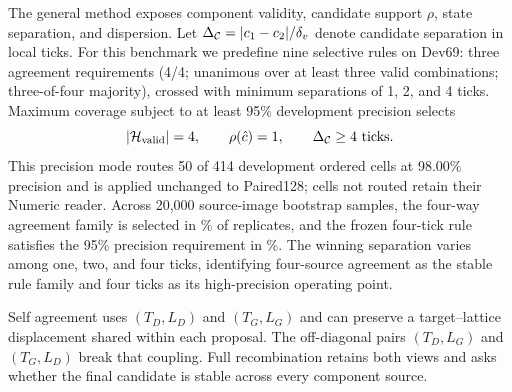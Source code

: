 The general method exposes component validity, candidate support $\rho$, state separation, and dispersion. Let $\Delta_{\mathcal{C}}=|c_1-c_2|/\delta_v$ denote candidate separation in local ticks. For this benchmark we predefine nine selective rules on Dev69: three agreement requirements (4/4; unanimous over at least three valid combinations; three-of-four majority), crossed with minimum separations of 1, 2, and 4 ticks. Maximum coverage subject to at least 95\% development precision selects
\begin{equation}
 |\mathcal{H}_{\rm valid}|=4,\qquad \rho(\hat c)=1,\qquad
 \Delta_{\mathcal{C}}\ge4~\text{ticks}.
 \label{eq:precision}
\end{equation}
This precision mode routes 50 of 414 development ordered cells at 98.00\% precision and is applied unchanged to Paired128; cells not routed retain their Numeric reader. Across 20,000 source-image bootstrap samples, the four-way agreement family is selected in \FourWayFamilyBootstrapSelection\% of replicates, and the frozen four-tick rule satisfies the 95\% precision requirement in \FrozenRuleBootstrapFeasible\%. The winning separation varies among one, two, and four ticks, identifying four-source agreement as the stable rule family and four ticks as its high-precision operating point.

Self agreement uses $(T_D,L_D)$ and $(T_G,L_G)$ and can preserve a target--lattice displacement shared within each proposal. The off-diagonal pairs $(T_D,L_G)$ and $(T_G,L_D)$ break that coupling. Full recombination retains both views and asks whether the final candidate is stable across every component source.
